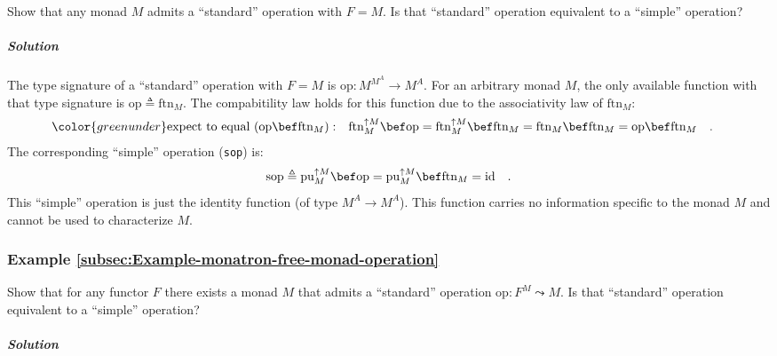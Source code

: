 Show that any monad $M$ admits a \textsf{``}standard\textsf{''} operation with $F=M$.
Is that \textsf{``}standard\textsf{''} operation equivalent to a \textsf{``}simple\textsf{''} operation?

\subparagraph{Solution}

The type signature of a \textsf{``}standard\textsf{''} operation with $F=M$ is $\text{op}:M^{M^{A}}\rightarrow M^{A}$.
For an arbitrary monad $M$, the only available function with that
type signature is $\text{op}\triangleq\text{ftn}_{M}$. The compabitility
law holds for this function due to the associativity law of $\text{ftn}_{M}$:
\begin{align*}
{\color{greenunder}\text{expect to equal }(\text{op}\bef\text{ftn}_{M}):}\quad & \text{ftn}_{M}^{\uparrow M}\bef\text{op}=\text{ftn}_{M}^{\uparrow M}\bef\text{ftn}_{M}=\text{ftn}_{M}\bef\text{ftn}_{M}=\text{op}\bef\text{ftn}_{M}\quad.
\end{align*}
The corresponding \textsf{``}simple\textsf{''} operation (\lstinline!sop!) is:
\[
\text{sop}\triangleq\text{pu}_{M}^{\uparrow M}\bef\text{op}=\text{pu}_{M}^{\uparrow M}\bef\text{ftn}_{M}=\text{id}\quad.
\]
This \textsf{``}simple\textsf{''} operation is just the identity function (of type
$M^{A}\rightarrow M^{A}$). This function carries no information specific
to the monad $M$ and cannot be used to characterize $M$. 

\subsubsection{Example \label{subsec:Example-monatron-free-monad-operation}\ref{subsec:Example-monatron-free-monad-operation}}

Show that for any functor $F$ there exists a monad $M$ that admits
a \textsf{``}standard\textsf{''} operation $\text{op}:F^{M}\leadsto M$. Is that \textsf{``}standard\textsf{''}
operation equivalent to a \textsf{``}simple\textsf{''} operation?

\subparagraph{Solution}

